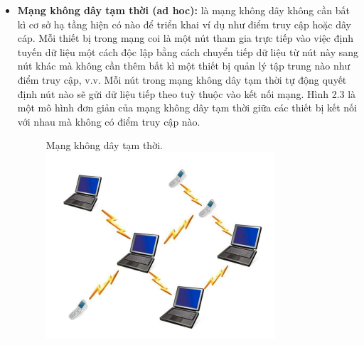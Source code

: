\documentclass{uetgraduation}
\begin{document}
\begin{itemize}
    Mạng cảm biến không dây có một số ứng dụng sau:
    \begin{itemize}
        \item Sử dụng trong lĩnh vực an ninh như giám sát ở các khu vực nhạy cảm để phát hiện các mối đe doạ như tấn công sinh học hoặc hoá học, v.v.
        \item Giám sát môi trường: WSN hỗ trợ thu thập thông tin ở những khu vực khó thiết lập cơ sở hạ tầng để giám sát môi trường cũng như môi trường sống.
        \item Trong y học: sử dụng để giúp các bác sĩ theo dõi sức khoẻ của bệnh nhân.
        \item Theo dõi đối tượng: WSN có thể dùng để theo dõi các đối tượng chuyển động nếu sử dụng cảm biến phù hợp.
        \item Hỗ trợ người khuyết tật: Người khuyết tật có thể độc lập hơn và cải thiện khả năng hoạt động với việc sử dụng WSN, WSN cho phép tự chăm sóc hiệu
        quả hơn và nâng cao chất lượng cuộc sống.
    \end{itemize}

    \item \textbf{Mạng không dây tạm thời (ad hoc):} là mạng không dây không cần bất kì cơ sở hạ tầng hiện có nào để triển khai ví dụ như điểm truy cập hoặc dây cáp.
    Mỗi thiết bị trong mạng coi là một nút tham gia trực tiếp vào việc định tuyến dữ liệu một cách độc lập bằng cách chuyển tiếp dữ liệu từ nút này sang nút khác
    mà không cần thêm bất kì một thiết bị quản lý tập trung nào như điểm truy cập, v.v. Mỗi nút trong mạng không dây tạm thời tự động quyết định nút nào sẽ gửi dữ
    liệu tiếp theo tuỳ thuộc vào kết nối mạng. Hình 2.3 là một mô hình đơn giản của mạng không dây tạm thời giữa các thiết bị kết nối với nhau mà không có điểm
    truy cập nào.
    \begin{figure}{Mạng không dây tạm thời.}
        \centering
        \includegraphics[scale=0.6]{ad_hoc}
        \label{fig:adhoc}
    \end{figure}


\end{itemize}
\end{document}
